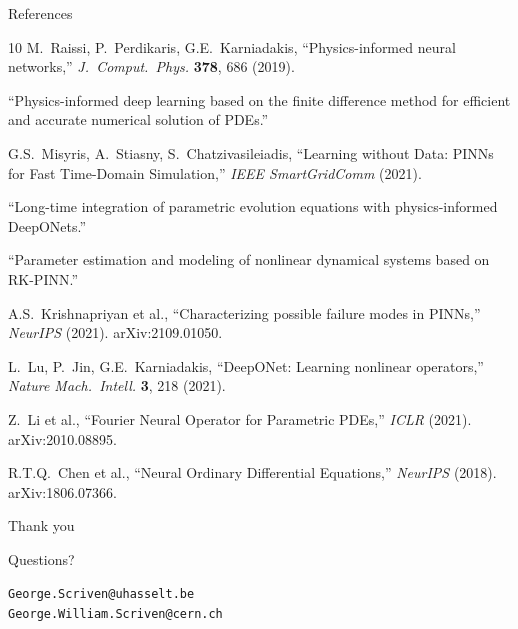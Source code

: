\documentclass[aspectratio=169, 11pt]{beamer}
\begin{document}
\begin{frame}[allowframebreaks]{References}
  \small
  \begin{thebibliography}{10}
    M.~Raissi, P.~Perdikaris, G.E.~Karniadakis,
    ``Physics-informed neural networks,''
    \textit{J.~Comput.~Phys.} \textbf{378}, 686 (2019).

    ``Physics-informed deep learning based on the finite difference method for efficient and accurate numerical solution of PDEs.''

    G.S.~Misyris, A.~Stiasny, S.~Chatzivasileiadis,
    ``Learning without Data: PINNs for Fast Time-Domain Simulation,''
    \textit{IEEE SmartGridComm} (2021).

    ``Long-time integration of parametric evolution equations with physics-informed DeepONets.''

    ``Parameter estimation and modeling of nonlinear dynamical systems based on RK-PINN.''

    A.S.~Krishnapriyan et al.,
    ``Characterizing possible failure modes in PINNs,''
    \textit{NeurIPS} (2021). arXiv:2109.01050.

    L.~Lu, P.~Jin, G.E.~Karniadakis,
    ``DeepONet: Learning nonlinear operators,''
    \textit{Nature Mach.~Intell.} \textbf{3}, 218 (2021).

    Z.~Li et al.,
    ``Fourier Neural Operator for Parametric PDEs,''
    \textit{ICLR} (2021). arXiv:2010.08895.

    R.T.Q.~Chen et al.,
    ``Neural Ordinary Differential Equations,''
    \textit{NeurIPS} (2018). arXiv:1806.07366.
  \end{thebibliography}
\end{frame}

\begin{frame}[plain]
  \centering
  \vfill
  {\Huge\textcolor{lhcbblue}{Thank you}}

  \bigskip
  {\large Questions?}

  \bigskip
  \small
  \texttt{George.Scriven@uhasselt.be} \\
  \texttt{George.William.Scriven@cern.ch}
  \vfill
\end{frame}
\end{document}
